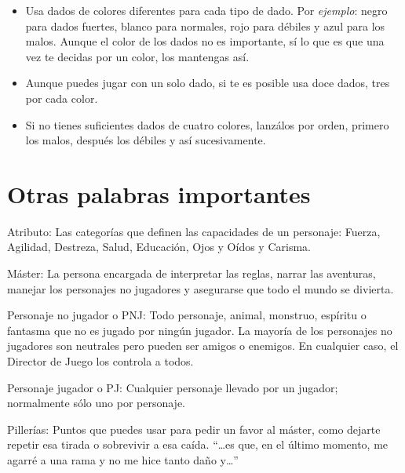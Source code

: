 
\begin{itemize}
\item Usa dados de colores diferentes para cada tipo de dado. Por \emph{ejemplo}: negro para dados fuertes, blanco para normales, rojo para débiles y azul para los malos. Aunque el color de los dados no es importante, sí lo que es que una vez te decidas por un color, los mantengas así.
\item Aunque puedes jugar con un solo dado, si te es posible usa doce dados, tres por cada color.
\item Si no tienes suficientes dados de cuatro colores, lanzálos por orden, primero los malos, después los débiles y así sucesivamente.

\end{itemize}

\section{Otras palabras importantes}

\begin{description}

\item{Atributo:} 
Las categorías que definen las capacidades de un personaje: Fuerza, Agilidad, Destreza, Salud, Educación, Ojos y Oídos y Carisma.

\item{Máster:} 
La persona encargada de interpretar las reglas, narrar las aventuras, manejar los personajes no jugadores y asegurarse que todo el mundo se divierta.

\item{Personaje no jugador o PNJ:} 
Todo personaje, animal, monstruo, espíritu o fantasma que no es jugado por ningún jugador. La mayoría de los personajes no jugadores son neutrales pero pueden ser amigos o enemigos. En cualquier caso, el Director de Juego los controla a todos.

\item{Personaje jugador o PJ:} 
Cualquier personaje llevado por un jugador; normalmente sólo uno por personaje.

\item{Pillerías:}
Puntos que puedes usar para pedir un favor al máster, como dejarte repetir esa tirada o sobrevivir a esa caída. \enquote{\dots es que, en el último momento, me agarré a una rama y no me hice tanto daño y\dots}

\end{description}